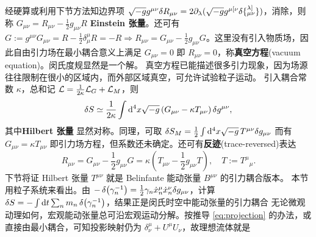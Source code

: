经硬算或利用下节方法知边界项 $\sqrt{-g} g^{\mu\nu}\var R_{\mu\nu}=2\partial_\lambda(\sqrt{-g} g^{\mu [\nu} \delta \{_{\mu \nu}^{\lambda]}\})$，消除，则
称 $G_{\mu\nu}=R_{\mu\nu}-\frac 12 g_{\mu\nu} R$ \textbf{Einstein 张量}。还可有 $G:=g^{\mu\nu}G_{\mu\nu}=R-\frac{1}{2}\delta^\mu_\mu R=-R\Rightarrow R_{\mu\nu}=G_{\mu\nu}-\frac 12 g_{\mu\nu} G$。这里没有引入物质场，因此自由引力场在最小耦合意义上满足 $G_{\mu\nu}=0$ 即 $R_{\mu\nu}=0$，称\textbf{真空方程}(vacuum equation)。闵氏度规显然是一个解。
真空方程已能描述很多引力现象，因为场源往往限制在很小的区域内，而外部区域真空，可允许试验粒子运动。
引入耦合常数 $\kappa$，总和记 $\mathcal{L}=\frac{1}{2\kappa}\mathcal{L}_G +\mathcal{L}_M$，则
\[
\var S\simeq\frac{1}{2\kappa}\int\dd[4]x\sqrt{-g} \left(G_{\mu\nu}-\kappa T_{\mu\nu}\right)\var g^{\mu\nu},
\]
其中\textbf{Hilbert 张量}
显然对称。同理，可取 $\delta S_M =\frac{1}{2} \int\dd[4]x\sqrt{-g}\, T^{\mu \nu} \delta g_{\mu \nu}$ 而有
$G_{\mu\nu}=\kappa T_{\mu\nu}$ 即引力场方程，但系数还未确定。还可有\textbf{反迹}(trace-reversed)表达
\[ 
R_{\mu\nu}=G_{\mu\nu}-\frac 12 g_{\mu\nu} G=\kappa\left(T_{\mu\nu}-\frac12 g_{\mu\nu}T\right),\quad T:=T^\mu{}_\mu.
\]
下节将证 Hilbert 张量 $T^{\mu\nu}$ 就是 Belinfante 能动张量 $B^{\mu\nu}$ 的引力耦合版本。
本节用粒子系统来看出。由 $-\var(\gamma_n^{-1})=\frac{1}{2}\gamma_n\dot x_n^\mu \dot x_n^\nu\delta g_{\mu\nu}$，计算 $\var S=-\int\dd t\sum_n m_n\var(\gamma_n^{-1})$，结果正是闵氏时空中能动张量的引力耦合
无论微观动理如何，宏观能动张量总可沿宏观运动分解。按推导 \eqref{eq:projection} 的办法，或直接由最小耦合，可知投影映射仍为 $\delta^\mu_\nu + U^\mu U_\nu$，故理想流体就是

